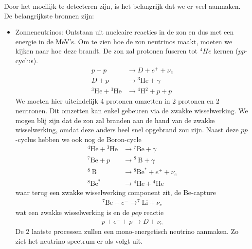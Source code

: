 \documentclass[../main.tex]{subfiles}
\begin{document}
Door het moeilijk te detecteren zijn, is het belangrijk dat we er veel aanmaken. De belangrijkste bronnen zijn:
\begin{itemize}
    \item Zonneneutrinos: Ontstaan uit nucleaire reacties in de zon en dus met een energie in de MeV's. Om te zien hoe de zon neutrinos maakt, moeten we kijken naar hoe deze brandt. De zon zal protonen fuseren tot $^4He$ kernen ($pp$-cyclus).
        \begin{equation}
            \begin{aligned}
                \label{eq:zon_fusie}
                p+p & \rightarrow D+e^{+}+\nu_{e} \\
                D+p & \rightarrow{ }^{3} \mathrm{He}+\gamma \\
                { }^{3} \mathrm{He}+{ }^{3} \mathrm{He} & \rightarrow{ }^{4} \mathrm{H}{ }^{2}+p+p
            \end{aligned}
        \end{equation}
        We moeten hier uiteindelijk 4 protonen omzetten in 2 protonen en 2 neutronen. Dit omzetten kan enkel gebeuren via de zwakke wisselwerking. We mogen blij zijn dat de zon zal branden aan de hand van de zwakke wisselwerking, omdat deze anders heel snel opgebrand zou zijn. Naast deze $pp$-cyclus hebben we ook nog de Boron-cycle
        \begin{equation}
            \begin{aligned}
                \label{eq:boron_cyclus}
                { }^{4} \mathrm{He}+{ }^{3} \mathrm{He} & \rightarrow{ }^{7} \mathrm{Be}+\gamma \\
                { }^{7} \mathrm{Be}+p & \rightarrow{ }^{8} \mathrm{~B}+\gamma \\
                { }^{8} \mathrm{~B} & \rightarrow{ }^{8} \mathrm{Be}^{*}+e^{+}+\nu_{e} \\
                { }^{8} \mathrm{Be}^{*} & \rightarrow{ }^{4} \mathrm{He}+{ }^{4} \mathrm{He}
            \end{aligned}
        \end{equation}
        waar terug een zwakke wisselwerking component zit, de Be-capture
        \begin{equation}
            \begin{aligned}
                \label{eq:be_capture}
                { }^{7} \mathrm{Be}+e^{-} \rightarrow^{7} \mathrm{Li}+\nu_{e}
            \end{aligned}
        \end{equation}
        wat een zwakke wisselwerking is en de $pep$ reactie
        \begin{equation}
            \begin{aligned}
                \label{eq:pep}
                p+e^{-}+p \rightarrow D+\nu_{e}
            \end{aligned}
        \end{equation}
        De 2 laatste processen zullen een mono-energetisch neutrino aanmaken. Zo ziet het neutrino spectrum er als volgt uit.


\end{itemize}
\end{document}
